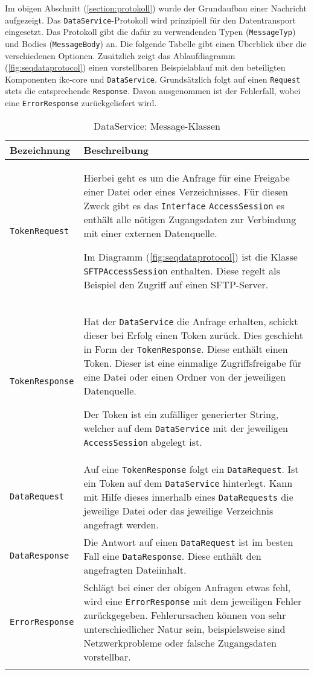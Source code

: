 Im obigen Abschnitt (\autoref{section:protokoll}) wurde der Grundaufbau einer Nachricht aufgezeigt. Das \texttt{DataService}-Protokoll wird prinzipiell für den Datentransport eingesetzt. Das Protokoll gibt die dafür zu verwendenden Typen (\texttt{MessageTyp}) und Bodies (\texttt{MessageBody}) an. Die folgende Tabelle gibt einen Überblick über die verschiedenen Optionen. Zusätzlich zeigt das Ablaufdiagramm (\autoref{fig:seqdataprotocol}) einen vorstellbaren Beispielablauf mit den beteiligten Komponenten \gls{ikc-core} und \texttt{DataService}. Grundsätzlich folgt auf einen \texttt{Request} stets die entsprechende \texttt{Response}. Davon ausgenommen ist der Fehlerfall, wobei eine \texttt{ErrorResponse} zurückgeliefert wird.

\begin{longtable}{|p{4cm}| p{8cm}|}
  \hline
    \textbf{Bezeichnung} & \textbf{Beschreibung}\\\hline
    \texttt{TokenRequest} & Hierbei geht es um die Anfrage für eine Freigabe einer Datei oder eines Verzeichnisses. Für diesen Zweck gibt es das \texttt{Interface} \texttt{AccessSession} es enthält alle nötigen Zugangsdaten zur Verbindung mit einer externen Datenquelle. \newline
    
    Im Diagramm (\autoref{fig:seqdataprotocol}) ist die Klasse \texttt{SFTPAccessSession} enthalten. Diese regelt als Beispiel den Zugriff auf einen SFTP-Server.
    \\\hline
    \texttt{TokenResponse} &    
    Hat der \texttt{DataService} die Anfrage erhalten, schickt dieser bei Erfolg einen Token zurück. Dies geschieht in Form der \texttt{TokenResponse}. Diese enthält einen \gls{Token}. Dieser ist eine einmalige Zugriffsfreigabe für eine Datei oder einen Ordner von der jeweiligen Datenquelle.\newline
    
    
    Der \gls{Token} ist ein zufälliger generierter String, welcher auf dem \texttt{DataService} mit der jeweiligen \texttt{AccessSession} abgelegt ist.\\\hline
    \texttt{DataRequest} & Auf eine \texttt{TokenResponse} folgt ein \texttt{DataRequest}. Ist ein \gls{Token} auf dem \texttt{DataService} hinterlegt. Kann mit Hilfe dieses innerhalb eines \texttt{DataRequests} die jeweilige Datei oder das jeweilige Verzeichnis angefragt werden. \\\hline
    \texttt{DataResponse} & Die Antwort auf einen \texttt{DataRequest} ist im besten Fall eine \texttt{DataResponse}. Diese enthält den angefragten Dateiinhalt. \\\hline
    \texttt{ErrorResponse} & Schlägt bei einer der obigen Anfragen etwas fehl, wird eine \texttt{ErrorResponse} mit dem jeweiligen Fehler zurückgegeben. Fehlerursachen können von sehr unterschiedlicher Natur sein, beispielsweise sind Netzwerkprobleme oder falsche Zugangsdaten vorstellbar.\\\hline
        \caption{DataService: Message-Klassen}
    \label{dataservice-bodies}
\end{longtable}


